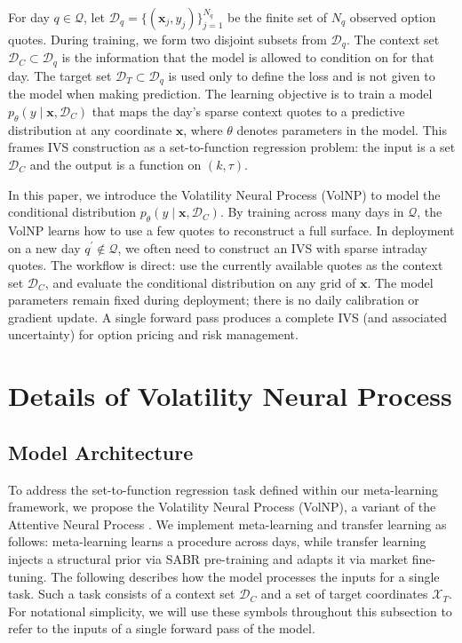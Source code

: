 \documentclass[authoryear,preprint,review,12pt]{elsarticle}
\begin{document}
For day $q\in\mathcal{Q}$, let $\mathcal{D}_q=\{(\mathbf{x}_j,y_j)\}_{j=1}^{N_q}$ be the finite set of $N_q$ observed option quotes. During training, we form two disjoint subsets from $\mathcal{D}_q$. The context set $\mathcal{D}_C\subset\mathcal{D}_q$ is the information that the model is allowed to condition on for that day. The target set $\mathcal{D}_T\subset\mathcal{D}_q$ is used only to define the loss and is not given to the model when making prediction. The learning objective is to train a model $p_\theta(y\mid \mathbf{x},\mathcal{D}_C)$ that maps the day’s sparse context quotes to a predictive distribution at any coordinate $\mathbf{x}$, where $\theta$ denotes parameters in the model. This frames IVS construction as a set-to-function regression problem: the input is a set $\mathcal{D}_C$ and the output is a function on $(k,\tau)$. 

In this paper, we introduce the Volatility Neural Process (VolNP) to model the conditional distribution $p_\theta(y\mid \mathbf{x},\mathcal{D}_C)$. By training across many days in $\mathcal{Q}$, the VolNP learns how to use a few quotes to reconstruct a full surface. In deployment on a new day $q^\prime\notin\mathcal{Q}$, we often need to construct an IVS with sparse intraday quotes. The workflow is direct: use the currently available quotes as the context set $\mathcal{D}_C$, and evaluate the conditional distribution on any grid of $\mathbf{x}$. The model parameters remain fixed during deployment; there is no daily calibration or gradient update. A single forward pass produces a complete IVS (and associated uncertainty) for option pricing and risk management. 



\section{Details of Volatility Neural Process}\label{sec3}


\subsection{Model Architecture}
To address the set-to-function regression task defined within our meta-learning framework, we propose the Volatility Neural Process (VolNP), a variant of the Attentive Neural Process \citep{kim2019attentive}. We implement meta-learning and transfer learning as follows: meta-learning learns a procedure across days, while transfer learning injects a structural prior via SABR pre-training and adapts it via market fine-tuning. The following describes how the model processes the inputs for a single task. Such a task consists of a context set \(\mathcal{D}_{C}\) and a set of target coordinates \(\mathcal{X}_{T}\). For notational simplicity, we will use these symbols throughout this subsection to refer to the inputs of a single forward pass of the model.
\end{document}
